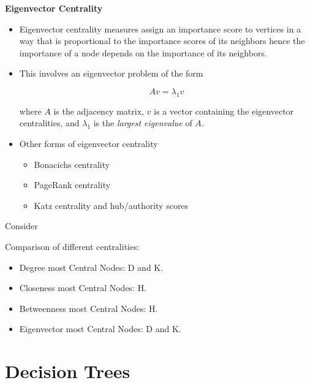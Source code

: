 \textbf{Eigenvector Centrality}
\begin{itemize}
    \item Eigenvector centrality measures assign an importance score to vertices in a way that is proportional to the importance scores of its neighbors hence the importance of a node depends on the importance of its neighbors.
    \item This involves an eigenvector problem of the form
          
          \begin{equation*}
              Av=\lambda _{1} v
          \end{equation*}
          
          where $A$ is the adjacency matrix, $v$ is a vector containing the eigenvector centralities, and $\lambda _{1}$ is the \textit{largest eigenvalue} of $A$.
    \item Other forms of eigenvector centrality
          \begin{itemize}
              \item Bonacichs centrality
              \item PageRank centrality
              \item Katz centrality and hub/authority scores
          \end{itemize}
\end{itemize}


Consider


Comparison of different centralities:
\begin{itemize}
    \item Degree most Central Nodes: D and K.
    \item Closeness most Central Nodes: H.
    \item Betweenness most Central Nodes: H.
    \item Eigenvector most Central Nodes: D and K.
\end{itemize}
\section{Decision Trees}
